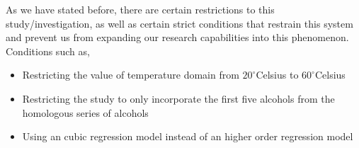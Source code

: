 {As we have stated before, there are certain restrictions to this study/investigation, as well as certain strict conditions that restrain this system and prevent us from expanding our research capabilities into this phenomenon. Conditions such as,}
        
    \begin{itemize}
        \item {Restricting the value of temperature domain from $20^\circ$Celsius to $60^\circ$Celsius}
        \item {Restricting the study to only incorporate the first five alcohols from the homologous series of alcohols}
        \item {Using an cubic regression model instead of an higher order regression model}
    \end{itemize}
        
        

